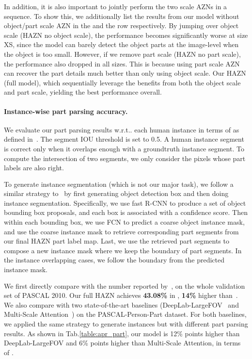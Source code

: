 \documentclass[runningheads]{llncs}
\makeatletter
\DeclareRobustCommand\onedot{\futurelet\@let@token\@onedot}
\def\@onedot{\ifx\@let@token.\else.\null\fi\xspace}
\def\wrt{w.r.t\onedot} \def\dof{d.o.f\onedot}
\makeatother
\begin{document}
In addition, it is also important to jointly perform the two scale AZNs in a sequence. To show this, we additionally list the results from our model without object/part scale AZN in the  and the  row respectively. 
By jumping over object scale (HAZN no object scale), the performance becomes significantly worse at size XS, since the model can barely detect the object parts at the image-level when the object is too small.  However, if we remove part scale (HAZN no part scale), the performance also dropped in all sizes. This is because using part scale AZN can recover the part details much better than only using object scale. Our HAZN (full model), which sequentially leverage the benefits from both the object scale and part scale, yielding the best performance overall.

\paragraph{Instance-wise part parsing accuracy.} We evaluate our part parsing results \wrt each human instance in terms of  as defined in~\cite{hariharan2014hypercolumns}. The segment IOU threshold is set to 0.5. A human instance segment is correct only when it overlaps enough with a groundtruth instance segment. To compute the intersection of two segments, we only consider the pixels whose part labels are also right. 

To generate instance segmentation (which is not our major task), we follow a similar strategy to~\cite{hariharan2014hypercolumns} by first generating object detection box and then doing instance segmentation. Specifically, we use fast R-CNN to produce a set of object bounding box proposals, and each box is associated with a confidence score. Then within each bounding box, we use FCN to predict a coarse object instance mask, and use the coarse instance mask to retrieve corresponding part segments from our final HAZN part label map. Last, we use the retrieved part segments to compose a new instance mask where we keep the boundary of part segments. In the instance overlapping cases, we follow the boundary from the predicted instance mask.

We first directly compare with the number reported by~\cite{hariharan2014hypercolumns}, on the whole validation set of PASCAL 2010. Our full HAZN achieves \textbf{43.08\%} in , \textbf{14\%} higher than~\cite{hariharan2014hypercolumns}. We also compare with two state-of-the-art baselines (DeepLab-LargeFOV~\cite{chen2014semantic} and Multi-Scale Attention~\cite{chen2015attention}) on the PASCAL-Person-Part dataset. For both baselines, we applied the same strategy to generate instances but with different part parsing results. As shown in Tab.\ref{table:apr_part}, our model is 12\% points higher than DeepLab-LargeFOV and 6\% points higher than Multi-Scale Attention, in terms of . 
\end{document}
